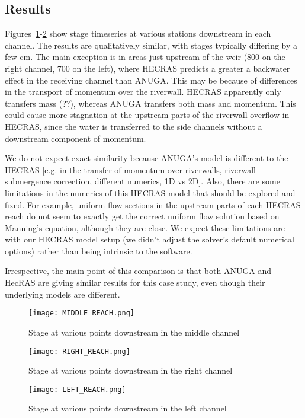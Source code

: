\subsection{Results}

Figures~\ref{midReach}-\ref{leftReach} show stage timeseries at various
stations downstream in each channel. The results are qualitatively similar,
with stages typically differing by a few cm. The main exception is in areas
just upstream of the weir (800 on the right channel, 700 on the left), where
HECRAS predicts a greater a backwater effect in the receiving channel than
ANUGA. This may be because of differences in the transport of momentum over the
riverwall. HECRAS apparently only transfers mass (??), whereas ANUGA transfers
both mass and momentum. This could cause more stagnation at the upstream parts
of the riverwall overflow in HECRAS, since the water is transferred to the side
channels without a downstream component of momentum.

We do not expect exact similarity because ANUGA's model is different to the
HECRAS [e.g. in the transfer of momentum over riverwalls, riverwall submergence
correction, different numerics, 1D vs 2D]. Also, there are some limitations in
the numerics of this HECRAS model that should be explored and fixed. For
example, uniform flow sections in the upstream parts of each HECRAS reach do
not seem to exactly get the correct uniform flow solution based on Manning's
equation, although they are close. We expect these limitations are with our
HECRAS model setup (we didn't adjust the solver's default numerical options)
rather than being intrinsic to the software. 

Irrespective, the main point of this comparison is that both ANUGA and HecRAS
are giving similar results for this case study, even though their underlying
models are different.


\begin{figure}
\begin{center}
\texttt{[image: MIDDLE\_REACH.png]}
\end{center}
\caption{Stage at various points downstream in the middle channel}
\label{midReach}
\end{figure}

\begin{figure}
\begin{center}
\texttt{[image: RIGHT\_REACH.png]}
\end{center}
\caption{Stage at various points downstream in the right channel}
\end{figure}

\begin{figure}
\begin{center}
\texttt{[image: LEFT\_REACH.png]}
\end{center}
\caption{Stage at various points downstream in the left channel}
\label{leftReach}
\end{figure}


\endinput
